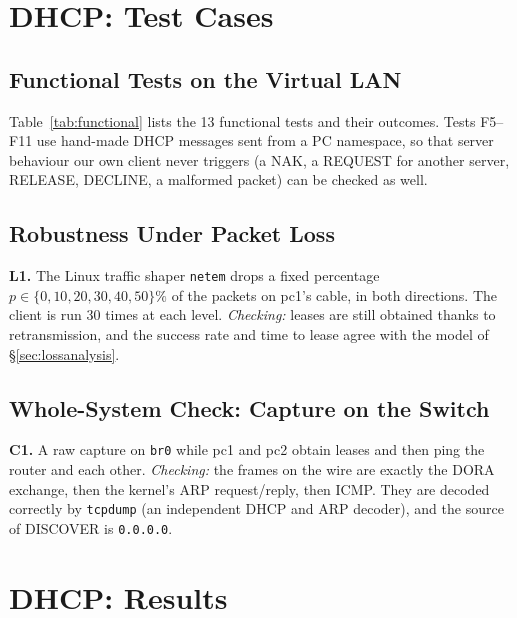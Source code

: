 \documentclass[11pt]{article}
\begin{document}
\section{DHCP: Test Cases}
\label{sec:tests}

\subsection{Functional Tests on the Virtual LAN}
Table~\ref{tab:functional} lists the 13 functional tests and their outcomes. Tests F5--F11
use hand-made DHCP messages sent from a PC namespace, so that server behaviour our own
client never triggers (a NAK, a REQUEST for another server, RELEASE, DECLINE, a malformed
packet) can be checked as well.

\subsection{Robustness Under Packet Loss}
\textbf{L1.} The Linux traffic shaper \texttt{netem} drops a fixed percentage
$p\in\{0,10,20,30,40,50\}\%$ of the packets on pc1's cable, in both directions. The client
is run 30 times at each level. \emph{Checking:} leases are still obtained thanks to
retransmission, and the success rate and time to lease agree with the model of
\S\ref{sec:lossanalysis}.

\subsection{Whole-System Check: Capture on the Switch}
\textbf{C1.} A raw capture on \texttt{br0} while pc1 and pc2 obtain leases and then ping
the router and each other. \emph{Checking:} the frames on the wire are exactly the
DORA exchange, then the kernel's ARP request/reply, then ICMP. They are decoded correctly by
\texttt{tcpdump} (an independent DHCP and ARP decoder), and the source of DISCOVER is
\texttt{0.0.0.0}.

\section{DHCP: Results}
\label{sec:results}
\end{document}
